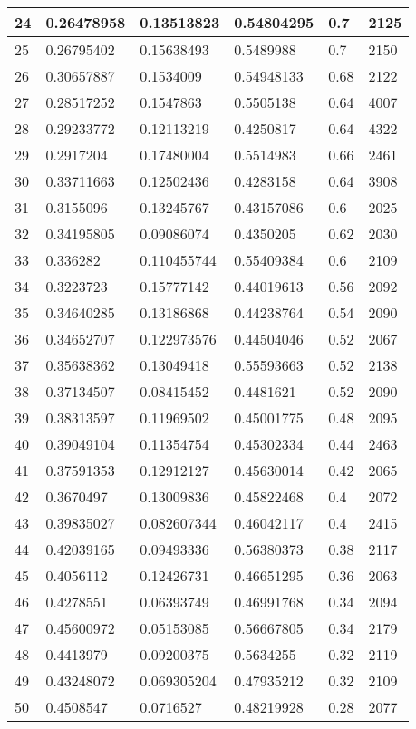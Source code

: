 \begin{longtable}{|l|l|l|l|l|l|}
24 & 0.26478958 & 0.13513823 & 0.54804295 & 0.7 & 2125 \\ \hline 
25 & 0.26795402 & 0.15638493 & 0.5489988 & 0.7 & 2150 \\ \hline 
26 & 0.30657887 & 0.1534009 & 0.54948133 & 0.68 & 2122 \\ \hline 
27 & 0.28517252 & 0.1547863 & 0.5505138 & 0.64 & 4007 \\ \hline 
28 & 0.29233772 & 0.12113219 & 0.4250817 & 0.64 & 4322 \\ \hline 
29 & 0.2917204 & 0.17480004 & 0.5514983 & 0.66 & 2461 \\ \hline 
30 & 0.33711663 & 0.12502436 & 0.4283158 & 0.64 & 3908 \\ \hline 
31 & 0.3155096 & 0.13245767 & 0.43157086 & 0.6 & 2025 \\ \hline 
32 & 0.34195805 & 0.09086074 & 0.4350205 & 0.62 & 2030 \\ \hline 
33 & 0.336282 & 0.110455744 & 0.55409384 & 0.6 & 2109 \\ \hline 
34 & 0.3223723 & 0.15777142 & 0.44019613 & 0.56 & 2092 \\ \hline 
35 & 0.34640285 & 0.13186868 & 0.44238764 & 0.54 & 2090 \\ \hline 
36 & 0.34652707 & 0.122973576 & 0.44504046 & 0.52 & 2067 \\ \hline 
37 & 0.35638362 & 0.13049418 & 0.55593663 & 0.52 & 2138 \\ \hline 
38 & 0.37134507 & 0.08415452 & 0.4481621 & 0.52 & 2090 \\ \hline 
39 & 0.38313597 & 0.11969502 & 0.45001775 & 0.48 & 2095 \\ \hline 
40 & 0.39049104 & 0.11354754 & 0.45302334 & 0.44 & 2463 \\ \hline 
41 & 0.37591353 & 0.12912127 & 0.45630014 & 0.42 & 2065 \\ \hline 
42 & 0.3670497 & 0.13009836 & 0.45822468 & 0.4 & 2072 \\ \hline 
43 & 0.39835027 & 0.082607344 & 0.46042117 & 0.4 & 2415 \\ \hline 
44 & 0.42039165 & 0.09493336 & 0.56380373 & 0.38 & 2117 \\ \hline 
45 & 0.4056112 & 0.12426731 & 0.46651295 & 0.36 & 2063 \\ \hline 
46 & 0.4278551 & 0.06393749 & 0.46991768 & 0.34 & 2094 \\ \hline 
47 & 0.45600972 & 0.05153085 & 0.56667805 & 0.34 & 2179 \\ \hline 
48 & 0.4413979 & 0.09200375 & 0.5634255 & 0.32 & 2119 \\ \hline 
49 & 0.43248072 & 0.069305204 & 0.47935212 & 0.32 & 2109 \\ \hline 
50 & 0.4508547 & 0.0716527 & 0.48219928 & 0.28 & 2077 \\ \hline 
\end{longtable}